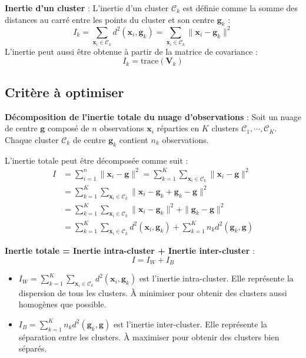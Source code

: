 \documentclass[10pt,a4paper]{article}
\begin{document}
\textbf{Inertie d'un cluster} :
L'inertie d'un cluster $\mathcal{C}_k$ est définie comme la somme des distances au carré entre les points du cluster et son centre $\mathbf{g}_k$ :
$$I_k = \sum_{\mathbf{x}_i \in \mathcal{C}_k} d^2(\mathbf{x}_i, \mathbf{g}_k) = \sum_{\mathbf{x}_i \in \mathcal{C}_k} \|\mathbf{x}_i - \mathbf{g}_k\|^2$$
L'inertie peut aussi être obtenue à partir de la matrice de covariance :
$$I_k = \text{trace}(\mathbf{V}_k)$$

\subsection*{Critère à optimiser}

\textbf{Décomposition de l'inertie totale du nuage d'observations} :
Soit un nuage de centre $\mathbf{g}$ composé de $n$ observations $\mathbf{x}_i$ réparties en $K$ clusters $\mathcal{C}_1, \cdots, \mathcal{C}_K$. Chaque cluster $\mathcal{C}_k$ de centre $\mathbf{g}_k$ contient $n_k$ observations.

L'inertie totale peut être décomposée comme suit :
$$
\begin{aligned}
I &= \sum_{i=1}^{n}\|\mathbf{x}_i - \mathbf{g}\|^2 = \sum_{k=1}^{K} \sum_{\mathbf{x}_i \in \mathcal{C}_k} \|\mathbf{x}_i - \mathbf{g}\|^2 \\
&= \sum_{k=1}^{K} \sum_{\mathbf{x}_i \in \mathcal{C}_k} \|\mathbf{x}_i - \mathbf{g}_k + \mathbf{g}_k - \mathbf{g}\|^2 \\
&= \sum_{k=1}^{K} \sum_{\mathbf{x}_i \in \mathcal{C}_k} \|\mathbf{x}_i - \mathbf{g}_k\|^2 + \|\mathbf{g}_k - \mathbf{g}\|^2 \\
&= \sum_{k=1}^{K} \sum_{\mathbf{x}_i \in \mathcal{C}_k} d^2(\mathbf{x}_i, \mathbf{g}_k) + \sum_{k=1}^{K} n_k d^2(\mathbf{g}_k, \mathbf{g})
\end{aligned}
$$

\textbf{Inertie totale = Inertie intra-cluster + Inertie inter-cluster} :
$$I = I_W + I_B$$
\begin{itemize}
    \item $I_W = \sum_{k=1}^{K} \sum_{\mathbf{x}_i \in \mathcal{C}_k} d^2(\mathbf{x}_i, \mathbf{g}_k)$ est l'inertie intra-cluster. Elle représente la dispersion de tous les clusters. À minimiser pour obtenir des clusters aussi homogènes que possible.
    \item $I_B = \sum_{k=1}^{K} n_k d^2(\mathbf{g}_k, \mathbf{g})$ est l'inertie inter-cluster. Elle représente la séparation entre les clusters. À maximiser pour obtenir des clusters bien séparés.
\end{itemize}
\end{document}
